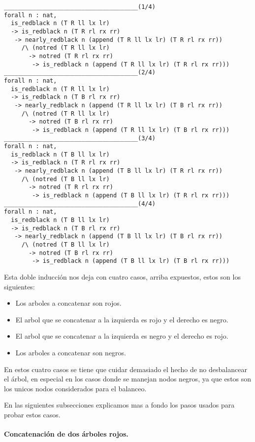 \begin{verbatim}
______________________________________(1/4)
forall n : nat,
  is_redblack n (T R ll lx lr)
  -> is_redblack n (T R rl rx rr)
   -> nearly_redblack n (append (T R ll lx lr) (T R rl rx rr))
     /\ (notred (T R ll lx lr)
       -> notred (T R rl rx rr)
        -> is_redblack n (append (T R ll lx lr) (T R rl rx rr)))
______________________________________(2/4)
forall n : nat,
  is_redblack n (T R ll lx lr)
  -> is_redblack n (T B rl rx rr)
   -> nearly_redblack n (append (T R ll lx lr) (T B rl rx rr))
     /\ (notred (T R ll lx lr)
       -> notred (T B rl rx rr)
        -> is_redblack n (append (T R ll lx lr) (T B rl rx rr)))
______________________________________(3/4)
forall n : nat,
  is_redblack n (T B ll lx lr)
  -> is_redblack n (T R rl rx rr)
   -> nearly_redblack n (append (T B ll lx lr) (T R rl rx rr))
     /\ (notred (T B ll lx lr)
       -> notred (T R rl rx rr)
        -> is_redblack n (append (T B ll lx lr) (T R rl rx rr)))
______________________________________(4/4)
forall n : nat,
  is_redblack n (T B ll lx lr)
  -> is_redblack n (T B rl rx rr)
   -> nearly_redblack n (append (T B ll lx lr) (T B rl rx rr))
     /\ (notred (T B ll lx lr)
       -> notred (T B rl rx rr)
        -> is_redblack n (append (T B ll lx lr) (T B rl rx rr)))
\end{verbatim}

Esta doble inducci\'on nos deja con cuatro casos, arriba expuestos, estos son los siguientes:
\begin{itemize}
    \item Los arboles a concatenar son rojos.
    \item El arbol que se concatenar a la izquierda es rojo y el derecho es negro.
    \item El arbol que se concatenar a la izquierda es negro y el derecho es rojo.
    \item Los arboles a concatenar son negros.
\end{itemize}

En estos cuatro casos se tiene que cuidar demasiado el hecho de no desbalancear el \'arbol, en
especial en los casos donde se manejan nodos negros, ya que estos son los unicos nodos
considerados para el balanceo.

En las siguientes subsecciones explicamos mas a fondo los pasos usados para probar estos casos.


\paragraph{Concatenaci\'on de dos \'arboles rojos.}

